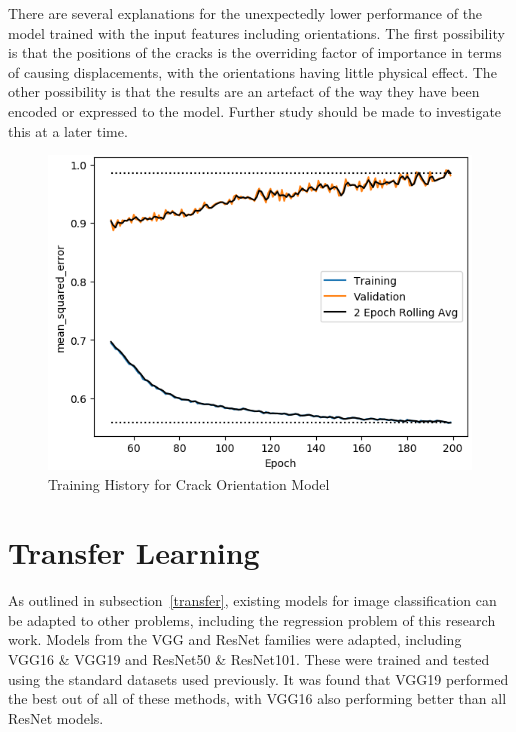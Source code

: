 \noindent There are several explanations for the unexpectedly lower performance of the model trained with the input features including orientations. The first possibility is that the positions of the cracks is the overriding factor of importance in terms of causing displacements, with the orientations having little physical effect. The other possibility is that the results are an artefact of the way they have been encoded or expressed to the model. Further study should be made to investigate this at a later time.

\begin{figure}[!ht]
	\centering
	\includegraphics[scale=0.7]{Figures/train_history_ori.png}
	\caption{Training History for Crack Orientation Model }
	\label{fig:history_ori}
\end{figure}

\section{Transfer Learning}


As outlined in subsection~\ref{transfer}, existing models for image classification can be adapted to other problems, including the regression problem of this research work. Models from the VGG and ResNet families were adapted, including VGG16 \& VGG19 and ResNet50 \& ResNet101. These were trained and tested using the standard datasets used previously. It was found that VGG19 performed the best out of all of these methods, with VGG16 also performing better than all ResNet models.
\\

